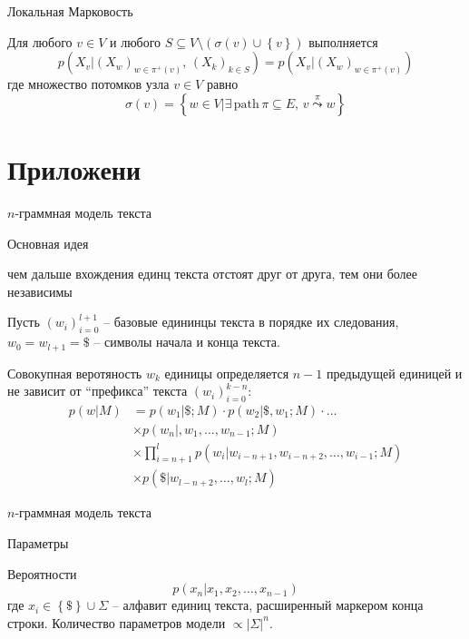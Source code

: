 \documentclass{beamer}
\newcommand{\obj}[1]{\left\{ #1 \right \}}
\newcommand{\brac}[1]{\left ( #1 \right )}
\newcommand{\induc}[1]{\left . #1 \right \vert}
\newcommand{\abs}[1]{\left | #1 \right |}
\begin{document}
\begin{frame}
  \begin{block}{Локальная Марковость}

    Для любого $v\in V$ и любого $S\subseteq V\setminus\brac{\sigma(v)\cup\obj{v}}$ выполняется
    \[p\brac{\induc{X_v}\brac{X_w}_{w\in \pi^+(v)},\,\brac{X_k}_{k\in S} } = p\brac{\induc{X_v}\brac{X_w}_{w\in \pi^+(v)} }\]
    где множество потомков узла $v\in V$ равно
    \[\sigma(v) = \obj{\induc{w\in V} \exists\,\text{path}\,\pi\subseteq E,\, v\overset{\pi}{\leadsto}w}\]
    
  \end{block}

\end{frame}

\section{Приложени} %
\label{sec:applications}

\begin{frame}{$n$-граммная модель текста}
  \begin{block}{Основная идея}

     чем дальше вхождения единц текста отстоят друг от друга, тем они более независимы
  \end{block}

  \begin{block}

    Пусть $\brac{w_i}_{i=0}^{l+1}$ -- базовые едининцы текста в порядке их следования, $w_0=w_{l+1}=\$$ -- символы начала и конца текста.

    Совокупная веротяность $w_k$ единицы определяется $n-1$ предыдущей единицей и не зависит от ``префикса'' текста $\brac{w_i}_{i=0}^{k-n}$:
    \begin{align*}
      p\brac{\induc{w}M} &= p\brac{\induc{w_1}\$;M} \cdot p\brac{\induc{w_2}\$,w_1;M} \cdot \ldots \\
        &\times p\brac{\induc{w_n},w_1,\ldots,w_{n-1};M} \\
        &\times \prod_{i=n+1}^l p\brac{\induc{w_i}w_{i-n+1}, w_{i-n+2}, \ldots, w_{i-1};M} \\ 
        &\times p\brac{\induc{\$}w_{l-n+2}, \ldots, w_l;M}
    \end{align*}
  \end{block}
\end{frame}

\begin{frame}{$n$-граммная модель текста}
  \begin{block}{Параметры}

    Вероятности
    \[p\brac{\induc{x_n}x_1, x_2, \ldots, x_{n-1}}\] 
    где $x_i\in \obj{\$}\cup \Sigma$ -- алфавит единиц текста, расширенный маркером конца строки.
    Количество параметров модели $\propto \abs{\Sigma}^n$.
  \end{block}
\end{frame}
\end{document}
